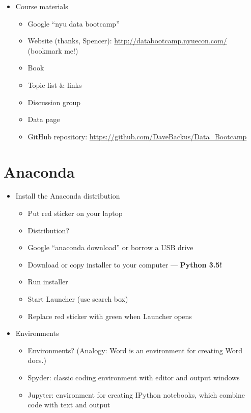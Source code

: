 \documentclass[11pt]{article}
\begin{document}
\begin{itemize}
\item Course materials
\begin{itemize}
\item Google ``nyu data bootcamp''
\item Website (thanks, Spencer):  \url{http://databootcamp.nyuecon.com/}  (bookmark me!)
\item Book
\item Topic list \& links
\item Discussion group
\item Data page 
\item GitHub repository:  \url{https://github.com/DaveBackus/Data_Bootcamp}
\end{itemize}

\end{itemize}


\section*{Anaconda}

\begin{itemize}
\item Install the Anaconda distribution
\begin{itemize}
\item Put red sticker on your laptop
\item Distribution?
\item Google ``anaconda download'' or borrow a USB drive
\item Download or copy installer to your computer --- {\bf Python 3.5!}
\item Run installer
\item Start Launcher (use search box)
\item Replace red sticker with green when Launcher opens
\end{itemize}

\item Environments
\begin{itemize}
\item Environments?  (Analogy:  Word is an environment for creating Word docs.) 
\item Spyder:  classic coding environment with editor and output windows
\item Jupyter:  environment for creating IPython notebooks, which combine code with text and output
\end{itemize}

\end{itemize}
\end{document}
